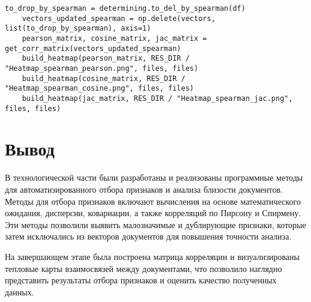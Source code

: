 \begin{lstlisting}[label=get_res, caption={Внесение измений и построение тепловых карт}]
    to_drop_by_spearman = determining.to_del_by_spearman(df)
    vectors_updated_spearman = np.delete(vectors, list(to_drop_by_spearman), axis=1)
    pearson_matrix, cosine_matrix, jac_matrix = get_corr_matrix(vectors_updated_spearman)
    build_heatmap(pearson_matrix, RES_DIR / "Heatmap_spearman_pearson.png", files, files)
    build_heatmap(cosine_matrix, RES_DIR / "Heatmap_spearman_cosine.png", files, files)
    build_heatmap(jac_matrix, RES_DIR / "Heatmap_spearman_jac.png", files, files)
\end{lstlisting}

\section*{Вывод}

В технологической части были разработаны и реализованы программные методы для автоматизированного отбора признаков и анализа близости документов.
Методы для отбора признаков включают вычисления на основе математического ожидания, дисперсии, ковариации, а также корреляций по Пирсону и Спирмену. 
Эти методы позволили выявить малозначимые и дублирующие признаки, которые затем исключались из векторов документов для повышения точности анализа.

На завершающем этапе была построена матрица корреляции и визуализированы тепловые карты взаимосвязей между документами,
что позволило наглядно представить результаты отбора признаков и оценить качество полученных данных.

\clearpage

